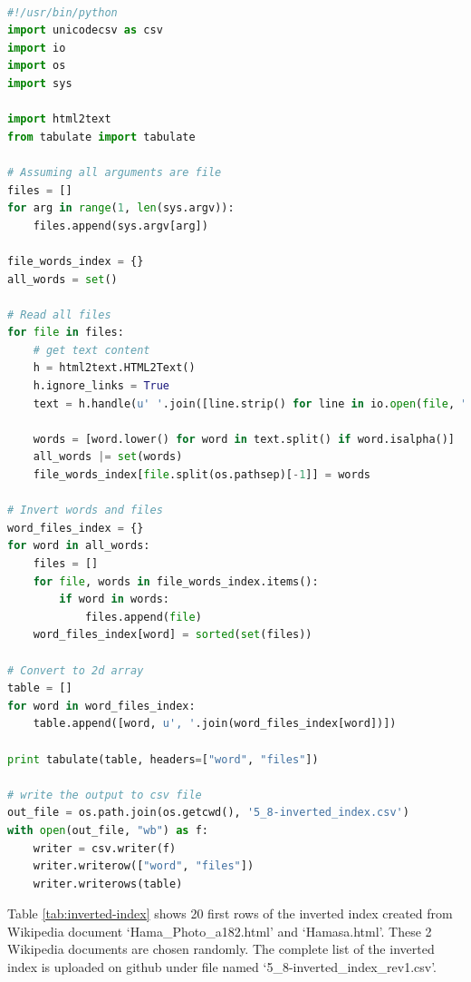 \documentclass[letterpaper,11pt]{article}
\begin{document}
\begin{lstlisting}[language=python, caption={Source code for simple inverted index}, label={lst:inverted-index}]

#!/usr/bin/python
import unicodecsv as csv
import io
import os
import sys

import html2text
from tabulate import tabulate

# Assuming all arguments are file
files = []
for arg in range(1, len(sys.argv)):
    files.append(sys.argv[arg])

file_words_index = {}
all_words = set()

# Read all files
for file in files:
    # get text content
    h = html2text.HTML2Text()
    h.ignore_links = True
    text = h.handle(u' '.join([line.strip() for line in io.open(file, "r", encoding="utf-8").readlines()]))

    words = [word.lower() for word in text.split() if word.isalpha()]
    all_words |= set(words)
    file_words_index[file.split(os.pathsep)[-1]] = words

# Invert words and files
word_files_index = {}
for word in all_words:
    files = []
    for file, words in file_words_index.items():
        if word in words:
            files.append(file)
    word_files_index[word] = sorted(set(files))

# Convert to 2d array
table = []
for word in word_files_index:
    table.append([word, u', '.join(word_files_index[word])])

print tabulate(table, headers=["word", "files"])

# write the output to csv file
out_file = os.path.join(os.getcwd(), '5_8-inverted_index.csv')
with open(out_file, "wb") as f:
    writer = csv.writer(f)
    writer.writerow(["word", "files"])
    writer.writerows(table)
\end{lstlisting}

Table \ref{tab:inverted-index} shows 20 first rows of the inverted index created from Wikipedia document `Hama\_Photo\_a182.html' and `Hamasa.html'. These 2 Wikipedia documents are chosen randomly. The complete list of the inverted index is uploaded on github under file named `5\_8-inverted\_index\_rev1.csv'.
\end{document}
